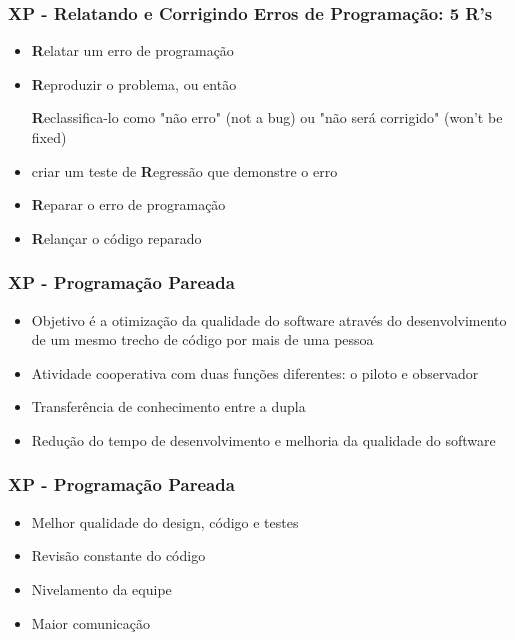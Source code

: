 \begin{frame}
 \frametitle{XP - Relatando e Corrigindo Erros de Programação: 5 R's}
 \begin{itemize}
  \item \textbf{R}elatar um erro de programação
  \item \textbf{R}eproduzir o problema, ou então
  
  \textbf{R}eclassifica-lo como "não erro" (not a bug) ou "não será corrigido" (won't be fixed)
  \item criar um teste de \textbf{R}egressão que demonstre o erro
  \item \textbf{R}eparar o erro de programação
  \item \textbf{R}elançar o código reparado 
  
 \end{itemize}
\end{frame}

\begin{frame}
 \frametitle{XP - Programação Pareada}
 \begin{itemize}
  \item  Objetivo é a otimização da qualidade do software através  do desenvolvimento de um mesmo trecho de código por mais de uma pessoa
  \item Atividade cooperativa com duas funções diferentes: o piloto e observador
  \item Transferência de conhecimento entre a dupla
  \item Redução do tempo de desenvolvimento e melhoria da qualidade do software
 \end{itemize}
\end{frame}

\begin{frame}
 \frametitle{XP - Programação Pareada}
 \begin{itemize}
  \item Melhor qualidade do design, código e testes
  \item Revisão constante do código
  \item Nivelamento da equipe
  \item Maior comunicação
 \end{itemize}
\end{frame}

